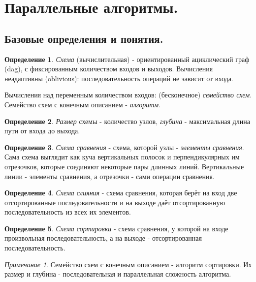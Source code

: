 \documentclass[a4paper]{article}
\theoremstyle{indented}
\theoremstyle{definition}
\newtheorem{defn}{Определение}
\theoremstyle{remark}
\newtheorem{remark}{Примечание}
\begin{document}
\section{Параллельные алгоритмы.}

\subsection{Базовые определения и понятия.}

\begin{defn}
    \textit{Схема} (вычислительная) - ориентированный ациклический граф (dag), с фиксированным количеством входов и выходов. Вычисления неадаптивны (oblivious): последовательность операций не зависит от входа. \ 

    Вычисления над переменным количеством входов: (бесконечное) \textit{семейство схем}. Семейство схем с конечным описанием - \textit{алгоритм}.
\end{defn}

\begin{defn}
    \textit{Размер} схемы - количество узлов, \textit{глубина} - максимальная длина пути от входа до выхода.
\end{defn}

\begin{defn}
    \textit{Схема сравнения} - схема, которой узлы - \textit{элементы сравнения}. Сама схема выглядит как куча вертикальных полосок и перпендикулярных им отрезочков, которые соединяют некоторые пары длинных линий. Вертикальные линии - элементы сравнения, а отрезочки - сами операции сравнения.
\end{defn}

\begin{defn}
    \textit{Схема слияния} - схема сравнения, которая берёт на вход две отсортированные последовательности и на выходе даёт отсортированную последовательность из всех их элементов.
\end{defn}

\begin{defn}
    \textit{Схема сортировки} - схема сравнения, у которой на входе произвольная последовательность, а на выходе - отсортированная последовательность.
\end{defn}

\begin{remark}
    Семейство схем с конечным описанием - алгоритм сортировки. Их размер и глубина - последовательная и параллельная сложность алгоритма. 
\end{remark}
\end{document}
